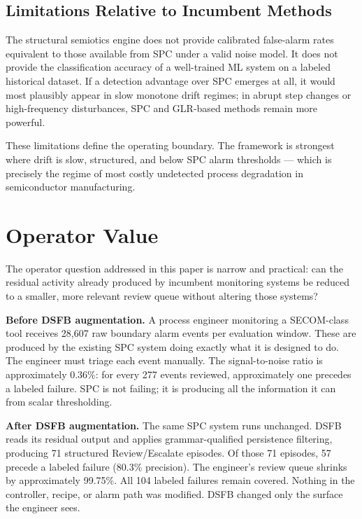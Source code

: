 \documentclass[11pt,letterpaper]{article}
\theoremstyle{scresult}
\begin{document}
\subsection{Limitations Relative to Incumbent Methods}

The structural semiotics engine does not provide calibrated false-alarm rates
equivalent to those available from SPC under a valid noise model. It does not
provide the classification accuracy of a well-trained ML system on a labeled
historical dataset. If a detection advantage over SPC emerges at all, it would
most plausibly appear in slow monotone drift regimes; in abrupt step changes or
high-frequency disturbances, SPC and GLR-based methods remain more powerful.

These limitations define the operating boundary. The framework is strongest
where drift is slow, structured, and below SPC alarm thresholds --- which is
precisely the regime of most costly undetected process degradation in
semiconductor manufacturing.

\section{Operator Value}
\label{sec:operator-value}

The operator question addressed in this paper is narrow and practical: can the
residual activity already produced by incumbent monitoring systems be reduced to
a smaller, more relevant review queue without altering those systems?

\textbf{Before DSFB augmentation.} A process engineer monitoring a SECOM-class
tool receives 28{,}607 raw boundary alarm events per evaluation window. These
are produced by the existing SPC system doing exactly what it is designed to do.
The engineer must triage each event manually. The signal-to-noise ratio is
approximately 0.36\%: for every 277 events reviewed, approximately one precedes
a labeled failure. SPC is not failing; it is producing all the information it
can from scalar thresholding.

\textbf{After DSFB augmentation.} The same SPC system runs unchanged. DSFB reads
its residual output and applies grammar-qualified persistence filtering,
producing 71 structured Review/Escalate episodes. Of those 71 episodes, 57
precede a labeled failure (80.3\% precision). The engineer's review queue shrinks
by approximately 99.75\%. All 104 labeled failures remain covered. Nothing in
the controller, recipe, or alarm path was modified. DSFB changed only the
surface the engineer sees.
\end{document}
